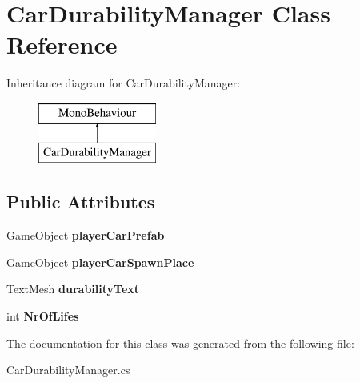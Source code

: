 \hypertarget{class_car_durability_manager}{}\section{Car\+Durability\+Manager Class Reference}
\label{class_car_durability_manager}
Inheritance diagram for Car\+Durability\+Manager\+:\begin{figure}[H]
\begin{center}
\leavevmode
\includegraphics[height=2.000000cm]{class_car_durability_manager}
\end{center}
\end{figure}
\subsection*{Public Attributes}
\begin{DoxyCompactItemize}
\item 
\mbox{\label{class_car_durability_manager_a409e9361daf37959c10b1688f83e2671}} 
Game\+Object {\bfseries player\+Car\+Prefab}
\item 
\mbox{\label{class_car_durability_manager_a2051dd135639e79ae89f3dda7700a7c3}} 
Game\+Object {\bfseries player\+Car\+Spawn\+Place}
\item 
\mbox{\label{class_car_durability_manager_aa71c2564d7d5d5699fd5f3ed4925c534}} 
Text\+Mesh {\bfseries durability\+Text}
\item 
\mbox{\label{class_car_durability_manager_ab5f76ce6be91794c08975d0b699d4ed0}} 
int {\bfseries Nr\+Of\+Lifes}
\end{DoxyCompactItemize}


The documentation for this class was generated from the following file\+:\begin{DoxyCompactItemize}
\item 
Car\+Durability\+Manager.\+cs\end{DoxyCompactItemize}
